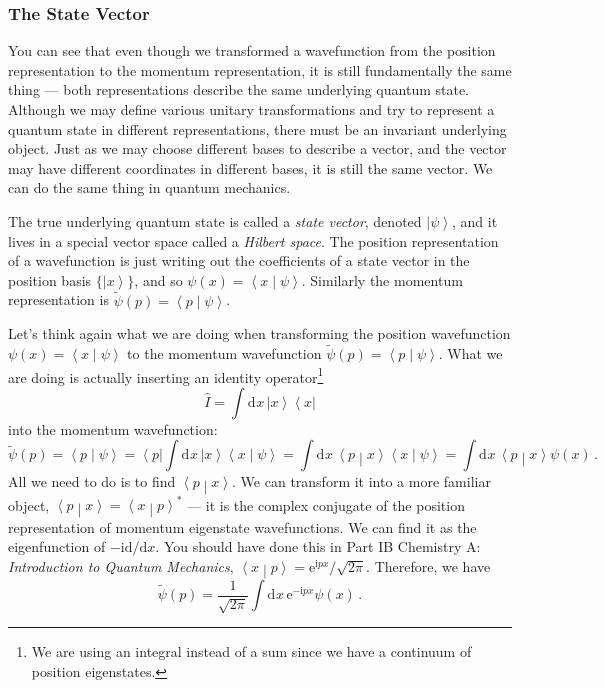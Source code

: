 \documentclass{article}
\theoremstyle{plain}\theoremheaderfont{\normalfont\itshape}\theorembodyfont{\rmfamily}\theoremseparator{.}\newtheorem*{rem}{Remark}\newtheorem*{ex}{Example}\newtheorem*{proof}{Proof}\newtheorem*{altp}{Alternative proof}
\theoremstyle{plain}\theoremheaderfont{\normalfont\bfseries}\theorembodyfont{\rmfamily}\theoremseparator{.}\newtheorem{thm}{Theorem}[section]\newtheorem{lem}[thm]{Lemma}\newtheorem{prop}[thm]{Proposition}\newtheorem*{cor}{Corollary}\newtheorem{defn}[thm]{Definition}\newtheorem{clm}[thm]{Claim}\newtheorem{clminproof}{Claim}
\theoremstyle{break}\theoremheaderfont{\normalfont\itshape}\theorembodyfont{\rmfamily}\theoremseparator{.\medskip}\newtheorem*{proofskip}{Proof}\newtheorem*{exs}{Examples}\newtheorem*{rems}{Remarks}
\theoremstyle{break}\theoremheaderfont{\normalfont\bfseries}\theorembodyfont{\rmfamily}\theoremseparator{.\medskip}\newtheorem{lemskip}[thm]{Lemma}\newtheorem{defnskip}[thm]{Definition}\newtheorem{propskip}[thm]{Proposition}\newtheorem{thmskip}[thm]{Theorem}
\numberwithin{equation}{section}
\newcommand{\ii}{\mathrm{i}}
\newcommand{\ee}{\mathrm{e}}
\newcommand{\dd}[2][]{\mathrm{d}^{#1} #2\,}
\newcommand{\bra}[1]{\left\langle #1 \right|}
\newcommand{\ket}[1]{\left| #1 \right\rangle}
\newcommand{\braket}[2]{\left\langle #1 \middle| #2 \right\rangle}
\begin{document}
    \subsubsection{The State Vector}
    You can see that even though we transformed a wavefunction from the position representation to the momentum representation, it is still fundamentally the same thing --- both representations describe the same underlying quantum state. Although we may define various unitary transformations and try to represent a quantum state in different representations, there must be an invariant underlying object. Just as we may choose different bases to describe a vector, and the vector may have different coordinates in different bases, it is still the same vector. We can do the same thing in quantum mechanics.

    The true underlying quantum state is called a \textit{state vector}, denoted \(\ket{\psi}\), and it lives in a special vector space called a \textit{Hilbert space}. The position representation of a wavefunction is just writing out the coefficients of a state vector in the position basis \(\{\ket{x}\}\), and so \(\psi(x)=\braket{x}{\psi}\). Similarly the momentum representation is \(\tilde{\psi}(p)=\braket{p}{\psi}\).

    Let's think again what we are doing when transforming the position wavefunction \(\psi(x)=\braket{x}{\psi}\) to the momentum wavefunction \(\tilde{\psi}(p)=\braket{p}{\psi}\). What we are doing is actually inserting an identity operator\footnote{We are using an integral instead of a sum since we have a continuum of position eigenstates.}
    \begin{equation}
        \hat{I}=\int\dd{x}\ket{x}\bra{x}
    \end{equation}
    into the momentum wavefunction:
    \begin{equation}
        \tilde{\psi}(p)=\braket{p}{\psi}=\bra{p}\int\dd{x}\ket{x}\braket{x}{\psi}=\int\dd{x}\braket{p}{x}\braket{x}{\psi}=\int\dd{x}\braket{p}{x}\psi(x)\,.
    \end{equation}
    All we need to do is to find \(\braket{p}{x}\). We can transform it into a more familiar object, \(\braket{p}{x}=\braket{x}{p}^*\) --- it is the complex conjugate of the position representation of momentum eigenstate wavefunctions. We can find it as the eigenfunction of \(-\ii\mathrm{d}/\mathrm{d}x\). You should have done this in Part IB Chemistry A: \textit{Introduction to Quantum Mechanics}, \(\braket{x}{p}=\ee^{\ii px}/\sqrt{2\pi}\). Therefore, we have
    \begin{equation}
        \tilde{\psi}(p)=\frac{1}{\sqrt{2\pi}}\int\dd{x}\ee^{-\ii px}\psi(x)\,.
    \end{equation}
    
\end{document}
